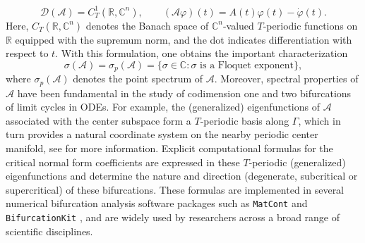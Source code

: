 \documentclass[english]{myarticle}
\begin{document}
\begin{sloppypar}
\begin{equation*}
    \mathcal{D}(\mathcal{A}) = C_T^1(\mathbb{R},\mathbb{C}^n), 
\qquad 
(\mathcal{A}\varphi)(t) = A(t)\varphi(t) - \dot{\varphi}(t).
\end{equation*}
Here, $C_T(\mathbb{R},\mathbb{C}^n)$ denotes the Banach space of $\mathbb{C}^n$-valued $T$-periodic functions on $\mathbb{R}$ equipped with the supremum norm, and the dot indicates differentiation with respect to $t$. With this formulation, one obtains the important characterization
\begin{equation} \label{intro:spectraequal}
    \sigma(\mathcal{A}) = \sigma_p(\mathcal{A})= \{ \sigma \in \mathbb{C} : \sigma \text{ is a Floquet exponent} \},
\end{equation}
where $\sigma_p(\mathcal{A})$ denotes the point spectrum of $\mathcal{A}$. Moreover, spectral properties of $\mathcal{A}$ have been fundamental in the study of codimension one \cite{Kuznetsov2005} and two \cite{Witte2014,Witte2013} bifurcations of limit cycles in ODEs. For example, the (generalized) eigenfunctions of $\mathcal{A}$ associated with the center subspace form a $T$-periodic basis along $\Gamma$, which in turn provides a natural coordinate system on the nearby periodic center manifold, see \cite{Iooss1988,Iooss1999,LentjesCMODE,Kuznetsov2023a} for more information. Explicit computational formulas for the critical normal form coefficients are expressed in these $T$-periodic (generalized) eigenfunctions and determine the nature and direction (degenerate, subcritical or supercritical) of these bifurcations. These formulas are implemented in several numerical bifurcation analysis software packages such as \verb|MatCont| \cite{Dhooge2003,Dhooge2008} and \verb|BifurcationKit| \cite{Veltz2020}, and are widely used by researchers across a broad range of scientific disciplines.


\end{sloppypar}
\end{document}
